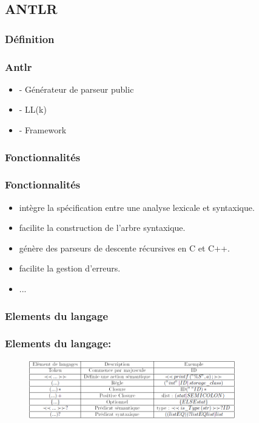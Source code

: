 \documentclass{beamer}
\begin{document}
\subsection{ANTLR}


\subsubsection{Définition}

	\begin{frame}
	\frametitle{Antlr}
 \begin{itemize}
			\item - Générateur de parseur public
			\item - LL(k)
			\item - Framework
			
\end{itemize}
\end{frame} 

\subsubsection{Fonctionnalités}

		\begin{frame}
	\frametitle{Fonctionnalités}
 \begin{itemize}
			\item intègre la spécification entre une analyse lexicale et syntaxique.
			\item facilite la construction de l’arbre syntaxique.
			\item génère des parseurs de descente récursives en C et C++.
			\item facilite la gestion d’erreurs.
			\item ...		
\end{itemize}
\end{frame} 

\subsubsection{Elements du langage}
\begin{frame}
	\frametitle{Elements du langage:}
	
\begin{figure}[h]
	\centering
		\includegraphics[width=0.80\textwidth]{tabantlr.png}
	\label{fig:tabantlr}
\end{figure}
\end{frame} 
\end{document}

